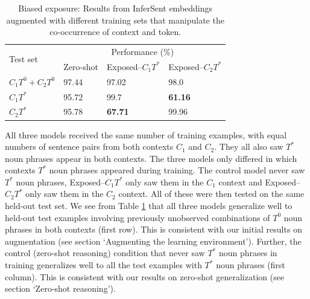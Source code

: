 \begin{table}[h!]
  \begin{center}
    \begin{tabular}{llll}
    \toprule
     \multirow{2}{*}{Test set} &
      \multicolumn{3}{c}{Performance (\%)} \\
       & Zero-shot  & Exposed--$C_{1}T^{*}$ & Exposed--$C_{2}T^{*}$ \\
    \midrule
    $C_{1}T^{0} + C_{2}T^{0}$ & 97.44 & 97.02 & 98.0\\
    
    $C_{1}T^{*}$  & 95.72 & 99.7 & \textbf{61.16}  \\
    
     $C_{2}T^{*}$ & 95.78 & \textbf{67.71} & 99.96 \\
    
\bottomrule
\end{tabular}
\end{center}
\caption{Biased exposure: Results from InferSent embeddings augmented with different training sets that manipulate the co-occurrence of context and token.}
  \label{tab:comb}
\end{table}

All three models received the same number of training examples, with equal numbers of sentence pairs from both contexts $C_{1}$ and $C_{2}$. They all also saw $T^{*}$ noun phrases appear in both contexts. The three models only differed in which contexts $T^{*}$ noun phrases appeared during training. The control model never saw $T^{*}$ noun phrases, Exposed--$C_{1}T^{*}$  only saw them in the $C_1$ context and Exposed--$C_{2}T^{*}$ only saw them in the $C_2$ context. All of these were then tested on the same held-out test set. We see from Table \ref{tab:comb} that all three models generalize well to held-out test examples involving previously unobserved combinations of $T^{0}$ noun phrases in both contexts (first row). This is consistent with our initial results on augmentation (see section `Augmenting the learning environment'). Further, the control (zero-shot reasoning) condition that never saw $T^{*}$ noun phrases in training generalizes well to all the test examples with $T^{*}$ noun phrases (first column). This is consistent with our results on zero-shot generalization (see section `Zero-shot reasoning'). 

